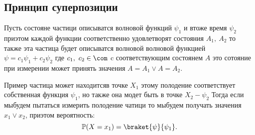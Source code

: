 \subsection{Принцип суперпозиции}
Пусть состояне частици описыватся волновой функций $\psi_1$
 и втоже время $\psi_2$ приэтом каждой функции соответственно удовлетворят
 состояния $A_1, \ A_2$ то также эта частица будет описыватся волновой 
 волновой функцией $\psi = c_1 \psi_1 + c_2 \psi_2$ где $c_1, \ c_2 \in 
 \com$ c соответствующим состоянем $A$ это сотояние при 
 измерении может принять значения $A = A_1 \lor A = A_2$.

Пример частица может находитсяв точке $X_1$ этому полодение соответствует 
 собственная функция $\psi_1$, но также она модет быть в точке $X_2 - \psi_2$ 
 Тогда если мыбудем пытаться измерить полодение чатици то мыбудем получать
 значения $x_1 \lor x_2$, приэтом вероятность: 
 \begin{equation} 
  \mathbb{P}(X = x_1) = \braket{\psi}{\psi_1}.
 \end{equation}

 









